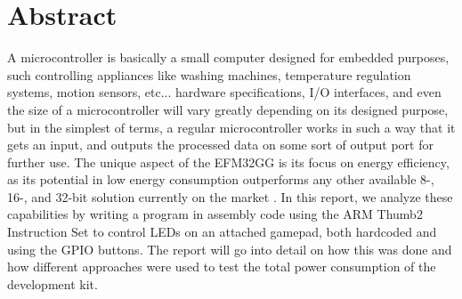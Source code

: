 \section{Abstract}

	A microcontroller is basically a small computer designed for embedded purposes, such controlling appliances like washing machines, temperature regulation systems, motion sensors, etc... hardware specifications, I/O interfaces, and even the size of a microcontroller will vary greatly depending on its designed purpose, but in the simplest of terms, a regular microcontroller works in such a way that it gets an input, and outputs the processed data on some sort of output port for further use.
	The unique aspect of the EFM32GG is its focus on energy efficiency, as its potential in low energy consumption outperforms any other available 8-, 16-, and 32-bit solution currently on the market \cite{EFM32GG-rm}. In this report, we analyze these capabilities by writing a program in assembly code using the ARM Thumb2 Instruction Set to control LEDs on an attached gamepad, both hardcoded and using the GPIO buttons. The report will go into detail on how this was done and how different approaches were used to test the total power consumption of the development kit.